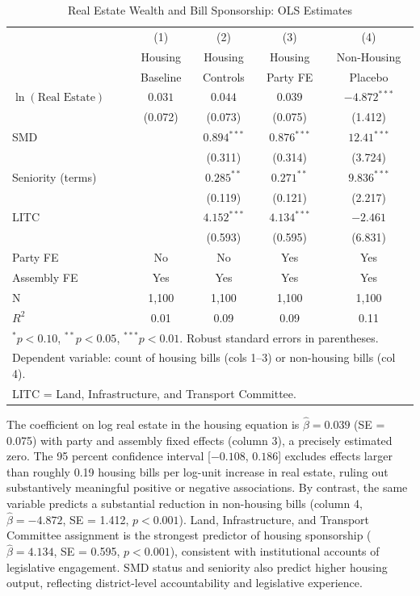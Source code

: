 \documentclass[11pt]{article}
\begin{document}
\begin{table}[htbp]
\centering
\caption{Real Estate Wealth and Bill Sponsorship: OLS Estimates}
\label{tab:regression}
\begin{tabular}{lcccc}
\toprule
& (1) & (2) & (3) & (4) \\
& Housing & Housing & Housing & Non-Housing \\
& Baseline & Controls & Party FE & Placebo \\
\midrule
$\ln(\text{Real Estate})$ & $0.031$ & $0.044$ & $0.039$ & $-4.872^{***}$ \\
 & (0.072) & (0.073) & (0.075) & (1.412) \\
SMD & & $0.894^{***}$ & $0.876^{***}$ & $12.41^{***}$ \\
 & & (0.311) & (0.314) & (3.724) \\
Seniority (terms) & & $0.285^{**}$ & $0.271^{**}$ & $9.836^{***}$ \\
 & & (0.119) & (0.121) & (2.217) \\
LITC & & $4.152^{***}$ & $4.134^{***}$ & $-2.461$ \\
 & & (0.593) & (0.595) & (6.831) \\
\midrule
Party FE & No & No & Yes & Yes \\
Assembly FE & Yes & Yes & Yes & Yes \\
N & 1,100 & 1,100 & 1,100 & 1,100 \\
$R^2$ & 0.01 & 0.09 & 0.09 & 0.11 \\
\bottomrule
\multicolumn{5}{l}{\footnotesize $^{*}p<0.10$, $^{**}p<0.05$, $^{***}p<0.01$. Robust standard errors in parentheses.} \\
\multicolumn{5}{l}{\footnotesize Dependent variable: count of housing bills (cols 1--3) or non-housing bills (col 4).} \\
\multicolumn{5}{l}{\footnotesize LITC = Land, Infrastructure, and Transport Committee.} \\
\end{tabular}
\end{table}

The coefficient on log real estate in the housing equation is $\hat{\beta} = 0.039$ (SE = 0.075) with party and assembly fixed effects (column 3), a precisely estimated zero. The 95 percent confidence interval [$-0.108$, $0.186$] excludes effects larger than roughly 0.19 housing bills per log-unit increase in real estate, ruling out substantively meaningful positive or negative associations. By contrast, the same variable predicts a substantial reduction in non-housing bills (column 4, $\hat{\beta} = -4.872$, SE = 1.412, $p < 0.001$). Land, Infrastructure, and Transport Committee assignment is the strongest predictor of housing sponsorship ($\hat{\beta} = 4.134$, SE = 0.595, $p < 0.001$), consistent with institutional accounts of legislative engagement. SMD status and seniority also predict higher housing output, reflecting district-level accountability and legislative experience.
\end{document}
